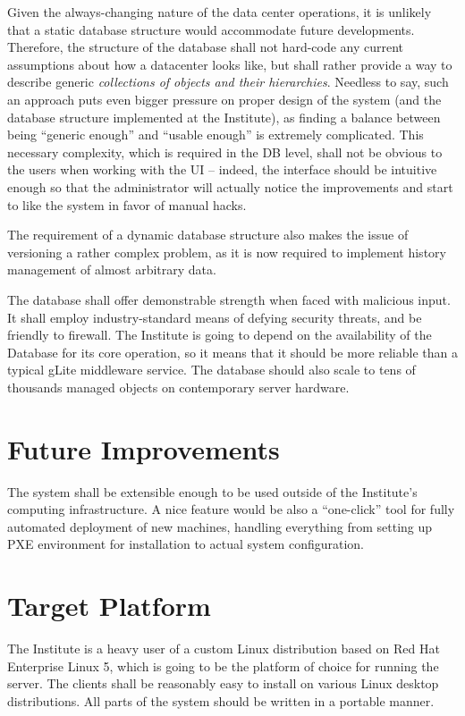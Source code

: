 \documentclass{article}
\begin{document}
Given the always-changing nature of the data center operations, it is unlikely that a static database structure would accommodate
future developments.  Therefore, the structure of the database shall not hard-code any current assumptions about how a datacenter
looks like, but shall rather provide a way to describe generic {\em collections of objects and their hierarchies}.  Needless to
say, such an approach puts even bigger pressure on proper design of the system (and the database structure implemented at the
Institute), as finding a balance between being ``generic enough'' and ``usable enough'' is extremely complicated.  This necessary
complexity, which is required in the DB level, shall not be obvious to the users when working with the UI -- indeed, the interface
should be intuitive enough so that the administrator will actually notice the improvements and start to like the system in favor
of manual hacks.

The requirement of a dynamic database structure also makes the issue of versioning a rather complex problem, as it is now required
to implement history management of almost arbitrary data. 

The database shall offer demonstrable strength when faced with malicious input.  It shall employ industry-standard means of
defying security threats, and be friendly to firewall.  The Institute is going to depend on the availability of the Database for
its core operation, so it means that it should be more reliable than a typical gLite middleware service.  The database should also
scale to tens of thousands managed objects on contemporary server hardware.

\section{Future Improvements}

The system shall be extensible enough to be used outside of the Institute's computing infrastructure.  A nice feature would be
also a ``one-click'' tool for fully automated deployment of new machines, handling everything from setting up PXE environment for
installation to actual system configuration.

\section{Target Platform}

The Institute is a heavy user of a custom Linux distribution based on Red Hat Enterprise Linux 5, which is going to be the
platform of choice for running the server.  The clients shall be reasonably easy to install on various Linux desktop
distributions.  All parts of the system should be written in a portable manner.
\end{document}
